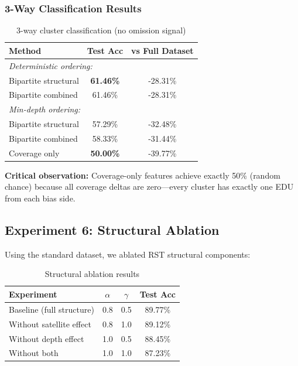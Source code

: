 \documentclass[11pt]{article}
\begin{document}
\subsubsection{3-Way Classification Results}

\begin{table}[h]
\centering
\begin{tabular}{lcc}
\toprule
\textbf{Method} & \textbf{Test Acc} & \textbf{vs Full Dataset} \\
\midrule
\multicolumn{3}{l}{\textit{Deterministic ordering:}} \\
Bipartite structural & \textbf{61.46\%} & -28.31\% \\
Bipartite combined & 61.46\% & -28.31\% \\
\midrule
\multicolumn{3}{l}{\textit{Min-depth ordering:}} \\
Bipartite structural & 57.29\% & -32.48\% \\
Bipartite combined & 58.33\% & -31.44\% \\
\midrule
Coverage only & \textbf{50.00\%} & -39.77\% \\
\bottomrule
\end{tabular}
\caption{3-way cluster classification (no omission signal)}
\label{tab:3way-results}
\end{table}

\textbf{Critical observation:} Coverage-only features achieve exactly 50\% (random chance) because all coverage deltas are zero---every cluster has exactly one EDU from each bias side.

\subsection{Experiment 6: Structural Ablation}

Using the standard dataset, we ablated RST structural components:

\begin{table}[h]
\centering
\begin{tabular}{lccc}
\toprule
\textbf{Experiment} & \textbf{$\alpha$} & \textbf{$\gamma$} & \textbf{Test Acc} \\
\midrule
Baseline (full structure) & 0.8 & 0.5 & 89.77\% \\
Without satellite effect & 0.8 & 1.0 & 89.12\% \\
Without depth effect & 1.0 & 0.5 & 88.45\% \\
Without both & 1.0 & 1.0 & 87.23\% \\
\bottomrule
\end{tabular}
\caption{Structural ablation results}
\label{tab:structural-ablation}
\end{table}
\end{document}
